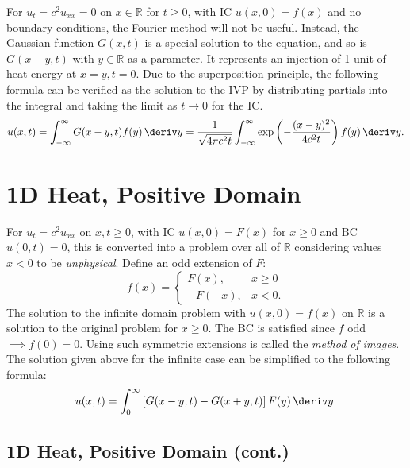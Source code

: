 \documentclass[10pt, a4paper]{article}
\begin{document}
\begin{landscape}
\begin{multicols*}{2}
    For \(u_t = c^2 u_{xx} = 0\) on \(x \in \mathbb{R}\) for \(t \geq 0\), with IC
    \(u(x, 0) = f(x)\) and no boundary conditions, the Fourier method will not be useful. Instead,
    the Gaussian function \(G(x, t)\) is a special solution to the equation, and so is \(G(x - y, t)\)
    with \(y \in \mathbb{R}\) as a parameter. It represents an injection of 1 unit of heat energy
    at \(x = y, t = 0\). Due to the superposition principle, the following formula can be verified
    as the solution to the IVP by distributing partials into the integral and taking the limit as
    \(t \to 0\) for the IC.
    \[
        u(x, t)
        = \int_{-\infty}^{\infty} G(x - y, t) f(y) \,\deriv y
        = \frac{1}{\sqrt{4 \pi c^2 t}} \int_{-\infty}^{\infty} \exp\left(-\frac{(x-y)^2}{4c^2 t}\right) f(y) \,\deriv y.
    \]

    \section{1D Heat, Positive Domain}

    For \(u_t = c^2 u_{xx}\) on \(x, t \geq 0\), with IC \(u(x, 0) = F(x)\) for \(x \geq 0\) and BC
    \(u(0, t) = 0\), this is converted into a problem over all of \(\mathbb{R}\) considering
    values \(x < 0\) to be \emph{unphysical}. Define an odd extension of \(F\):
    \[
        f(x) = \begin{cases}
            F(x), & x \geq 0 \\
            -F(-x), & x < 0.
        \end{cases}
    \]
    The solution to the infinite domain problem with \(u(x, 0) = f(x)\) on \(\mathbb{R}\) is a solution to the
    original problem for \(x \geq 0\). The BC is satisfied since \(f\) odd \(\implies f(0) = 0\).
    Using such symmetric extensions is called the \emph{method of images}.
    The solution given above for the infinite case can be simplified to the following formula:
    \[
        u(x, t) = \int_0^{\infty} \left[G(x-y, t) - G(x+y, t)\right] F(y) \,\deriv y.
    \]

\end{multicols*}

\pagebreak

\begin{multicols*}{2}

    \section{1D Heat, Positive Domain (cont.)}


\end{multicols*}
\end{landscape}
\end{document}
